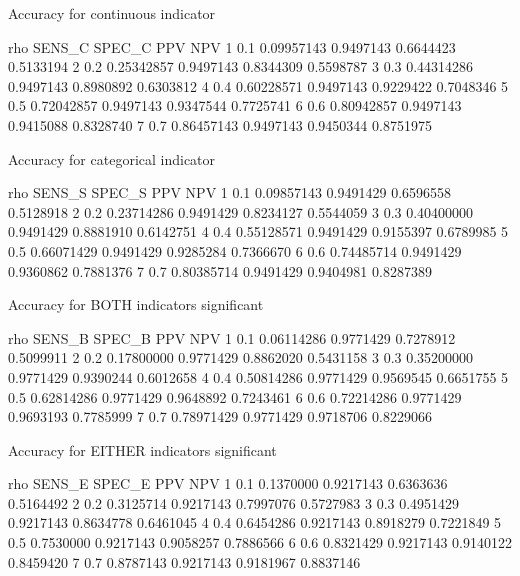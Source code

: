 \documentclass{article}
\begin{document}
\begin{Schunk}
\begin{Soutput}
Accuracy for continuous indicator
\end{Soutput}
\begin{Soutput}
  rho     SENS_C    SPEC_C       PPV       NPV
1 0.1 0.09957143 0.9497143 0.6644423 0.5133194
2 0.2 0.25342857 0.9497143 0.8344309 0.5598787
3 0.3 0.44314286 0.9497143 0.8980892 0.6303812
4 0.4 0.60228571 0.9497143 0.9229422 0.7048346
5 0.5 0.72042857 0.9497143 0.9347544 0.7725741
6 0.6 0.80942857 0.9497143 0.9415088 0.8328740
7 0.7 0.86457143 0.9497143 0.9450344 0.8751975
\end{Soutput}
\begin{Soutput}
Accuracy for categorical indicator
\end{Soutput}
\begin{Soutput}
  rho     SENS_S    SPEC_S       PPV       NPV
1 0.1 0.09857143 0.9491429 0.6596558 0.5128918
2 0.2 0.23714286 0.9491429 0.8234127 0.5544059
3 0.3 0.40400000 0.9491429 0.8881910 0.6142751
4 0.4 0.55128571 0.9491429 0.9155397 0.6789985
5 0.5 0.66071429 0.9491429 0.9285284 0.7366670
6 0.6 0.74485714 0.9491429 0.9360862 0.7881376
7 0.7 0.80385714 0.9491429 0.9404981 0.8287389
\end{Soutput}
\begin{Soutput}
Accuracy for BOTH indicators significant
\end{Soutput}
\begin{Soutput}
  rho     SENS_B    SPEC_B       PPV       NPV
1 0.1 0.06114286 0.9771429 0.7278912 0.5099911
2 0.2 0.17800000 0.9771429 0.8862020 0.5431158
3 0.3 0.35200000 0.9771429 0.9390244 0.6012658
4 0.4 0.50814286 0.9771429 0.9569545 0.6651755
5 0.5 0.62814286 0.9771429 0.9648892 0.7243461
6 0.6 0.72214286 0.9771429 0.9693193 0.7785999
7 0.7 0.78971429 0.9771429 0.9718706 0.8229066
\end{Soutput}
\begin{Soutput}
Accuracy for EITHER indicators significant
\end{Soutput}
\begin{Soutput}
  rho    SENS_E    SPEC_E       PPV       NPV
1 0.1 0.1370000 0.9217143 0.6363636 0.5164492
2 0.2 0.3125714 0.9217143 0.7997076 0.5727983
3 0.3 0.4951429 0.9217143 0.8634778 0.6461045
4 0.4 0.6454286 0.9217143 0.8918279 0.7221849
5 0.5 0.7530000 0.9217143 0.9058257 0.7886566
6 0.6 0.8321429 0.9217143 0.9140122 0.8459420
7 0.7 0.8787143 0.9217143 0.9181967 0.8837146
\end{Soutput}
\end{Schunk}
\end{document}
